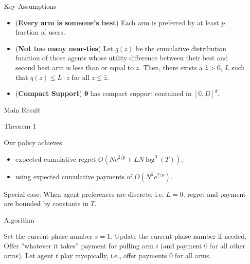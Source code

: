 \documentclass[serif]{beamer}
\begin{document}
\begin{frame}{Key Assumptions}
\begin{itemize}[label=\textbullet]
\item (\textbf{Every arm is someone's best}) Each arm is preferred by at least $p$ fraction of users.
\vspace{0.2cm}
\item (\textbf{Not too many near-ties}) Let $q(z)$ be the cumulative distribution function of those agents whose utility difference between their best and second best arm is less than or equal to $z$. Then, there exists a $\hat{z}>0$, $L$ such that $q(z)\leq L\cdot z$ for all $z\leq \hat{z}$.
\vspace{0.2cm}
\item (\textbf{Compact Support}) $\bm{\theta}$ has compact support contained in $[0,D]^{d}$.
\end{itemize}

\end{frame}

\begin{frame}{Main Result}
\begin{block}{Theorem 1}

Our policy achieves:
\begin{itemize}
\item expected cumulative regret $O (N e^{2/p} + L N \log^3(T))$,
\item using expected cumulative payments of $O(N^2 e^{2/p})$.
\end{itemize}
\end{block}

Special case: 
When agent preferences are discrete, i.e. $L=0$,
regret and payment are bounded by constants in $T$.



\end{frame}

\begin{frame}{Algorithm}

\begin{algorithmic}
\STATE Set the current phase number $s = 1$.
 {
\STATE Update the current phase number if needed;
    \STATE Offer ''whatever it takes'' payment for pulling arm $i$ (and payment 0 for all other arms).
\ELSE
    \STATE Let agent $t$ play myopically, i.e., offer payments 0 for all arms.
\ENDIF 
}\ENDFOR
\end{algorithmic}

\end{frame}
\end{document}
